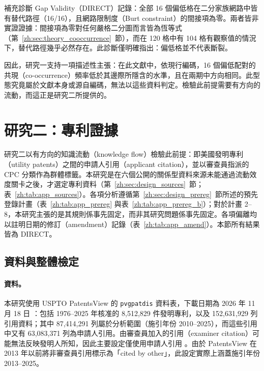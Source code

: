補充診斷 Gap Validity（DIRECT）記錄：全部 16 個偏低格在二分家族網路中皆有替代路徑（16/16），且網路限制度（Burt constraint）的間接項為零。兩者皆非實證證據：間接項為零對任何嚴格二分圖而言皆為恆等式（第~\ref{zh:sec:theory_cooccurrence}~節），而在 120 格中有 104 格有觀察值的情況下，替代路徑幾乎必然存在。此診斷僅明確指出：偏低格並不代表斷裂。

因此，研究一支持一項描述性主張：在此文獻中，依現行編碼，16 個偏低配對的共現（co-occurrence）頻率低於其邊際所隱含的水準，且在兩期中方向相同。此型態究竟屬於文獻本身或源自編碼，無法以這些資料判定。檢驗此前提需要有方向的流動，而這正是研究二所提供的。


\section{研究二：專利證據}
\label{zh:sec:study2}

研究二以有方向的知識流動（knowledge flow）檢驗此前提：即美國發明專利（utility patents）之間的申請人引用（applicant citation），並以審查員指派的 CPC 分類作為群體標籤。本研究是在六個公開的關係型資料來源未能通過流動效度關卡之後，才選定專利資料（第~\ref{zh:sec:design_sources}~節；表~\ref{zh:tab:app_sources}）。各項分析遵循第~\ref{zh:sec:design_prereg}~節所述的預先登錄計畫（表~\ref{zh:tab:app_prereg} 與表~\ref{zh:tab:app_prereg_b}）；對於計畫 2--8，本研究主張的是其規則係事先固定，而非其研究問題係事先固定。各項偏離均以註明日期的修訂（amendment）記錄（表~\ref{zh:tab:app_amend}）。本節所有結果皆為 DIRECT。

\subsection{資料與整體檢定}
\label{zh:sec:study2_aggregate}

\paragraph{資料。} 本研究使用 USPTO PatentsView 的 \texttt{pvgpatdis} 資料表，下載日期為 2026 年 11 月 18 日 \citep{uspto2026patentsview}：包括 1976--2025 年核准的 8,512,829 件發明專利，以及 152,631,929 列引用資料；其中 87,414,291 列屬於分析範圍（施引年份 2010--2025），而這些引用中又有 63,083,371 列為申請人引用。由審查員加入的引用（examiner citation）可能無法反映發明人所知，因此主要設定僅使用申請人引用 \citep{alcacer2006patent}。由於 PatentsView 在 2013 年以前將非審查員引用標示為「cited by other」，此設定實際上涵蓋施引年份 2013--2025。

